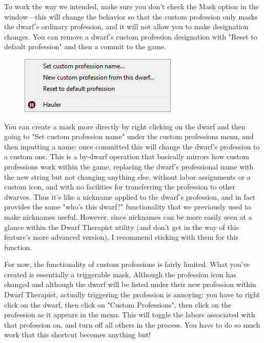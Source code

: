 \documentclass[]{article}
\begin{document}
To work the way we intended, make sure you don't check the Mask option in the window---this will change
the behavior so that the custom profession only masks the dwarf's ordinary profession, and it will not
allow you to make designation changes. You can remove a dwarf's custom profession designation with "Reset
to default profession" and then a commit to the game.

\begin{figure}
\vspace{-20pt}
  \begin{center}
    \includegraphics{Sec3Fig11}
  \end{center}
\vspace{-10pt}
\end{figure}
You can create a mask more directly by right clicking on the dwarf and then going to "Set custom
profession name" under the custom professions menu, and then inputting a name: once committed this will
change the dwarf's profession to a custom one. This is a by-dwarf operation that basically mirrors how
custom professions work within the game, replacing the dwarf's professional name with the new string but
not changing anything else, without labor assignments or a custom icon, and with no facilities for
transferring the profession to other dwarves. Thus it's like a nickname applied to the dwarf's
profession, and in fact provides the same "who's this dwarf?" functionality that we previously used to
make nicknames useful. However, since nicknames can be more easily seen at a glance within the Dwarf
Therapist utility (and don't get in the way of this feature's more advanced version), I recommend
sticking with them for this function.

For now, the functionality of custom professions is fairly limited. What you've created is essentially a
triggerable mask. Although the profession icon has changed and although the dwarf will be listed under
their new profession within Dwarf Therapist, actually triggering the profession is annoying: you have to
right click on the dwarf, then click on "Custom Professions", then click on the profession as it appears
in the menu. This will toggle the labors associated with that profession on, and turn off all others in
the process. You have to do so much work that this shortcut becomes anything but!
\end{document}
